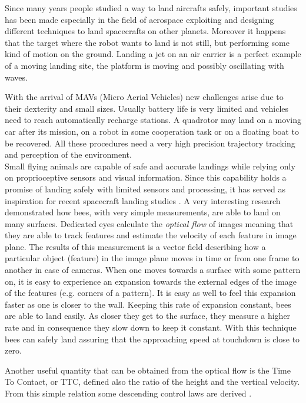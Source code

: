 Since many years people studied a way to land aircrafts safely, important studies has been made especially in the field of aerospace exploiting and designing different techniques to land spacecrafts on other planets. Moreover it happens that the target where the robot wants to land is not still, but performing some kind of motion on the ground. Landing a jet on an air carrier is a perfect example of a moving landing site, the platform is moving and possibly oscillating with waves.\par With the arrival of MAVs (Micro Aerial Vehicles) new challenges arise due to their dexterity and small sizes. Usually battery life is very limited and vehicles need to reach automatically recharge stations. A quadrotor may land on a moving car after its mission, on a robot in some cooperation task or on a floating boat to be recovered. All these procedures need a very high precision trajectory tracking and  perception of the environment.\\

\noindent
Small flying animals are capable of safe and accurate landings while relying only on proprioceptive sensors and visual information. Since this capability holds a promise of landing safely with limited sensors and processing, it has served as inspiration for recent spacecraft landing studies \cite{Izzo2012}. A very interesting research \cite{Baird2013} demonstrated how bees, with very simple measurements, are able to land on many surfaces. Dedicated eyes calculate the \textit{optical flow} of images meaning that they are able to track features and estimate the velocity of each feature in image plane. The results of this measurement is a vector field describing how a particular object (feature) in the image plane moves in time or from one frame to another in case of cameras. When one moves towards a surface with some pattern on, it is easy to experience an expansion towards the external edges of the image of the features (e.g. corners of a pattern). It is easy as well to feel this expansion faster as one is closer to the wall. Keeping this rate of expansion constant, bees are able to land easily. As closer they get to the surface, they measure a higher rate and in consequence they slow down to keep it constant. With this technique bees can safely land assuring that the approaching speed at touchdown is close to zero. \par
Another useful quantity that can be obtained from the optical flow is the Time To Contact, or TTC, defined also the ratio of the height and the vertical velocity. From this simple relation some descending control laws are derived \cite{Croon2015}. \\

